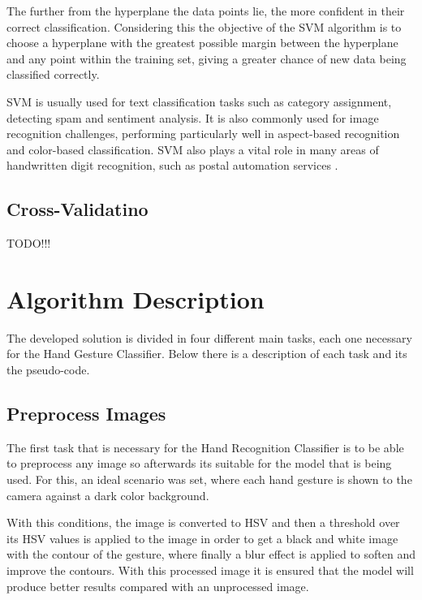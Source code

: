 \documentclass[a4paper,10pt,english]{article}
\begin{document}
        The further from the hyperplane the  data points lie, the more confident in their correct classification. Considering this the objective of the SVM algorithm is to choose a hyperplane with the greatest possible margin between the hyperplane and any point within the training set, giving a greater chance of new data being classified correctly.
        
        SVM is usually used for text classification tasks such as category assignment, detecting spam and sentiment analysis. It is also commonly used for image recognition challenges, performing particularly well in aspect-based recognition and color-based classification. SVM also plays a vital role in many areas of handwritten digit recognition, such as postal automation services \cite{SVM:Simple}.
        
        \subsection{Cross-Validatino}
        
        TODO!!!
    
    \section{Algorithm Description}\label{sec:algorithms}
    
         The developed solution is divided in four different main tasks, each one necessary for the Hand Gesture Classifier. Below there is a description of each task and its the pseudo-code.
         
         
        \subsection{Preprocess Images}
        
        The first task that is necessary for the Hand Recognition Classifier is to be able to preprocess any image so afterwards its suitable for the model that is being used. For this, an ideal scenario was set, where each hand gesture is shown to the camera against a dark color background.
        
        With this conditions, the image is converted to HSV and then a threshold over its HSV values is applied to the image in order to get a black and white image with the contour of the gesture, where finally a blur effect is applied to soften and improve the contours. With this processed image it is ensured that the model will produce better results compared with an unprocessed image.
    
\end{document}
